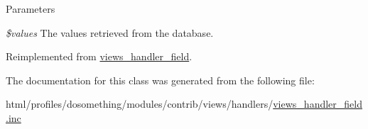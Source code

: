 \begin{DoxyParams}{Parameters}
\item[{\em \$values}]The values retrieved from the database. \end{DoxyParams}


Reimplemented from \hyperlink{classviews__handler__field_a82ff951c5e9ceb97b2eab86f880cbc1e}{views\_\-handler\_\-field}.

The documentation for this class was generated from the following file:\begin{DoxyCompactItemize}
\item 
html/profiles/dosomething/modules/contrib/views/handlers/\hyperlink{views__handler__field_8inc}{views\_\-handler\_\-field.inc}\end{DoxyCompactItemize}
